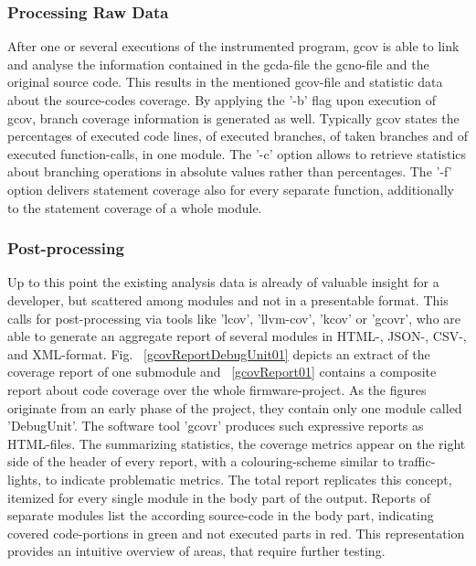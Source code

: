 			\subsubsection{Processing Raw Data}
				After one or several executions of the instrumented program, gcov is able to link and analyse the information contained in the gcda-file the gcno-file and the original source code. This results in the mentioned gcov-file and statistic data about the source-codes coverage. By applying the '-b' flag upon execution of gcov, branch coverage information is generated as well. Typically gcov states the percentages of executed code lines, of executed branches, of taken branches and of executed function-calls, in one module. The '-c' option allows to retrieve statistics about branching operations in absolute values rather than percentages. The '-f' option delivers statement coverage also for every separate function, additionally to the statement coverage of a whole module.
			\subsubsection{Post-processing}
				Up to this point the existing analysis data is already of valuable insight for a developer, but scattered among modules and not in a presentable format. This calls for post-processing via tools like 'lcov', 'llvm-cov', 'kcov' or 'gcovr', who are able to generate an aggregate report of several modules in HTML-, JSON-, CSV-, and XML-format. \cite{lcov} \cite{kcov}
				Fig. ~\ref{gcovReportDebugUnit01} depicts an extract of the coverage report of one submodule and ~\ref{gcovReport01} contains a composite report about code coverage over the whole firmware-project. As the figures originate from an early phase of the project, they contain only one module called 'DebugUnit'. The software tool 'gcovr' produces such expressive reports as HTML-files. The summarizing statistics, the coverage metrics appear on the right side of the header of every report, with a colouring-scheme similar to traffic-lights, to indicate problematic metrics. The total report replicates this concept, itemized for every single module in the body part of the output. Reports of separate modules list the according source-code in the body part, indicating covered code-portions in green and not executed parts in red. This representation provides an intuitive overview of areas, that require further testing.
			
